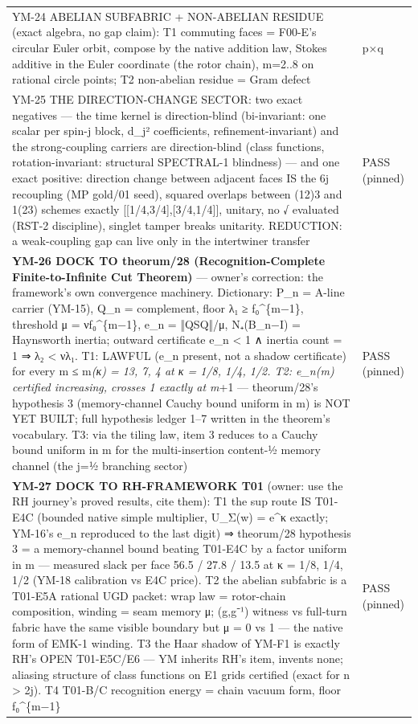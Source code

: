 \begin{longtable}[]{@{}
  >{\raggedright\arraybackslash}p{}
  >{\raggedright\arraybackslash}p{}@{}}
YM-24 ABELIAN SUBFABRIC + NON-ABELIAN RESIDUE (exact algebra, no gap claim): T1 commuting faces = F00-E's circular Euler orbit, compose by the native addition law, Stokes additive in the Euler coordinate (the rotor chain), m=2..8 on rational circle points; T2 non-abelian residue = Gram defect & p×q \\
YM-25 THE DIRECTION-CHANGE SECTOR: two exact negatives --- the time kernel is direction-blind (bi-invariant: one scalar per spin-j block, d\_j² coefficients, refinement-invariant) and the strong-coupling carriers are direction-blind (class functions, rotation-invariant: structural SPECTRAL-1 blindness) --- and one exact positive: direction change between adjacent faces IS the 6j recoupling (MP gold/01 seed), squared overlaps between (12)3 and 1(23) schemes exactly {[}{[}1/4,3/4{]},{[}3/4,1/4{]}{]}, unitary, no √ evaluated (RST-2 discipline), singlet tamper breaks unitarity. REDUCTION: a weak-coupling gap can live only in the intertwiner transfer & PASS (pinned) \\
\textbf{YM-26 DOCK TO theorum/28 (Recognition-Complete Finite-to-Infinite Cut Theorem)} --- owner's correction: the framework's own convergence machinery. Dictionary: P\_n = A-line carrier (YM-15), Q\_n = complement, floor λ₁ ≥ f₀\^{}\{m−1\}, threshold μ = νf₀\^{}\{m−1\}, e\_n = ‖QSQ‖/μ, N₊(B\_n−I) = Haynsworth inertia; outward certificate e\_n \textless{} 1 ∧ inertia count = 1 ⇒ λ₂ \textless{} νλ₁. T1: LAWFUL (e\_n present, not a shadow certificate) for every m ≤ m\emph{(κ) = 13, 7, 4 at κ = 1/8, 1/4, 1/2. T2: e\_n(m) certified increasing, crosses 1 exactly at m}+1 --- theorum/28's hypothesis 3 (memory-channel Cauchy bound uniform in m) is NOT YET BUILT; full hypothesis ledger 1--7 written in the theorem's vocabulary. T3: via the tiling law, item 3 reduces to a Cauchy bound uniform in m for the multi-insertion content-½ memory channel (the j=½ branching sector) & PASS (pinned) \\
\textbf{YM-27 DOCK TO RH-FRAMEWORK T01} (owner: use the RH journey's proved results, cite them): T1 the sup route IS T01-E4C (bounded native simple multiplier, U\_Σ(w) = e\^{}κ exactly; YM-16's e\_n reproduced to the last digit) ⇒ theorum/28 hypothesis 3 = a memory-channel bound beating T01-E4C by a factor uniform in m --- measured slack per face 56.5 / 27.8 / 13.5 at κ = 1/8, 1/4, 1/2 (YM-18 calibration vs E4C price). T2 the abelian subfabric is a T01-E5A rational UGD packet: wrap law = rotor-chain composition, winding = seam memory μ; (g,g⁻¹) witness vs full-turn fabric have the same visible boundary but μ = 0 vs 1 --- the native form of EMK-1 winding. T3 the Haar shadow of YM-F1 is exactly RH's OPEN T01-E5C/E6 --- YM inherits RH's item, invents none; aliasing structure of class functions on E1 grids certified (exact for n \textgreater{} 2j). T4 T01-B/C recognition energy = chain vacuum form, floor f₀\^{}\{m−1\} & PASS (pinned) \\

\end{longtable}
